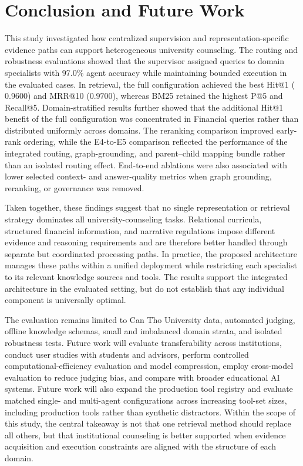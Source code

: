 \section{Conclusion and Future Work}
\label{sec:conclusion}

This study investigated how centralized supervision and representation-specific evidence paths can support heterogeneous university counseling. The routing and robustness evaluations showed that the supervisor assigned queries to domain specialists with 97.0\% agent accuracy while maintaining bounded execution in the evaluated cases. In retrieval, the full configuration achieved the best Hit@1 ($0.9600$) and MRR@10 ($0.9700$), whereas BM25 retained the highest P@5 and Recall@5. Domain-stratified results further showed that the additional Hit@1 benefit of the full configuration was concentrated in Financial queries rather than distributed uniformly across domains. The reranking comparison improved early-rank ordering, while the E4-to-E5 comparison reflected the performance of the integrated routing, graph-grounding, and parent--child mapping bundle rather than an isolated routing effect. End-to-end ablations were also associated with lower selected context- and answer-quality metrics when graph grounding, reranking, or governance was removed.

Taken together, these findings suggest that no single representation or retrieval strategy dominates all university-counseling tasks. Relational curricula, structured financial information, and narrative regulations impose different evidence and reasoning requirements and are therefore better handled through separate but coordinated processing paths. In practice, the proposed architecture manages these paths within a unified deployment while restricting each specialist to its relevant knowledge sources and tools. The results support the integrated architecture in the evaluated setting, but do not establish that any individual component is universally optimal.

The evaluation remains limited to Can Tho University data, automated judging, offline knowledge schemas, small and imbalanced domain strata, and isolated robustness tests. Future work will evaluate transferability across institutions, conduct user studies with students and advisors, perform controlled computational-efficiency evaluation and model compression, employ cross-model evaluation to reduce judging bias, and compare \system{} with broader educational AI systems. Future work will also expand the production tool registry and evaluate matched single- and multi-agent configurations across increasing tool-set sizes, including production tools rather than synthetic distractors. Within the scope of this study, the central takeaway is not that one retrieval method should replace all others, but that institutional counseling is better supported when evidence acquisition and execution constraints are aligned with the structure of each domain.
